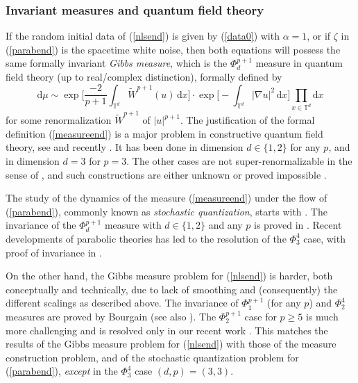\documentclass[11 pt,reqno]{amsart}
\theoremstyle{definition}
\theoremstyle{remark}
\numberwithin{equation}{section}
\newcommand{\Tb}{\mathbb{T}}
\begin{document}
{\subsubsection{Invariant measures and quantum field theory}\label{invmeas} If the random initial data of (\ref{nlsend}) is given by (\ref{data0}) with $\alpha=1$, or if $\zeta$ in (\ref{parabend}) is the spacetime white noise, then both equations will possess the same formally invariant \emph{Gibbs measure}, which is the $\Phi_d^{p+1}$ measure in quantum field theory (up to real/complex distinction), formally defined by
\begin{equation}\label{measureend}\mathrm{d}\mu\sim\exp\bigg[\frac{-2}{p+1}\int_{\Tb^d}\widetilde{W}^{p+1}(u)\,\mathrm{d}x\bigg]\cdot\exp\bigg[-\int_{\Tb^d}|\nabla u|^2\,\mathrm{d}x\bigg]\prod_{x\in\Tb^d}\mathrm{d}x
\end{equation} for some renormalization $\widetilde{W}^{p+1}$ of $|u|^{p+1}$. The justification of the formal definition (\ref{measureend}) is a major problem in constructive quantum field theory, see \cite{GJ1,Simon,Nel2} and recently \cite{BaGu0}. It has been done in dimension $d\in\{1,2\}$ for any $p$, and in dimension $d=3$ for $p=3$. The other cases are not super-renormalizable in the sense of \cite{CMW}, and such constructions are either unknown or proved impossible \cite{Aiz,AiCo,Fro}.

The study of the dynamics of the measure (\ref{measureend}) under the flow of (\ref{parabend}), commonly known as \emph{stochastic quantization}, starts with \cite{PW}. The invariance of the $\Phi_d^{p+1}$ measure with $d\in\{1,2\}$ and any $p$ is proved in \cite{DaDe2}. Recent developments of parabolic theories has led to the resolution of the $\Phi_3^4$ case, with proof of invariance in \cite{MouWe3,AK}.

On the other hand, the Gibbs measure problem for (\ref{nlsend}) is harder, both conceptually and technically, due to lack of smoothing and (consequently) the different scalings as described above. The invariance of $\Phi_1^{p+1}$ (for any $p$) and $\Phi_2^4$ measures are proved by Bourgain \cite{Bourgain94,Bourgain} (see also \cite{LRS}). The $\Phi_2^{p+1}$ case for $p\geq 5$ is much more challenging and is resolved only in our recent work \cite{DNY}. This matches the results of the Gibbs measure problem for (\ref{nlsend}) with those of the measure construction problem, and of the stochastic quantization problem for (\ref{parabend}), \emph{except} in the $\Phi_3^4$ case $(d,p)=(3,3)$.

}
\end{document}
